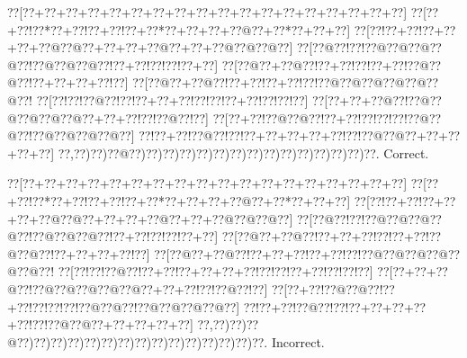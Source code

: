 \documentclass[a5paper]{article}
\begin{document}
\begin{center}
{\goo
\0??[\0??+\0??+\0??+\0??+\0??+\0??+\0??+\0??+\0??+\0??+\0??+\0??+\0??+\0??+\0??+\0??+\0??+\0??]
\0??[\0??+\0??!\0??*\0??+\0??!\0??+\0??!\0??+\0??*\0??+\0??+\0??+\0??@\0??+\0??*\0??+\0??+\0??]
\0??[\0??!\0??+\0??!\0??+\0??+\0??+\0??@\0??@\0??+\0??+\0??+\0??@\0??+\0??+\0??@\0??@\0??@\0??]
\0??[\0??@\0??!\0??!\0??@\0??@\0??@\0??@\0??!\0??@\0??@\0??@\0??!\0??+\0??!\0??!\0??!\0??+\0??]
\0??[\0??@\0??+\0??@\0??!\0??+\0??!\0??!\0??+\0??!\0??@\0??@\0??!\0??+\0??+\0??+\0??!\0??]
\0??[\0??@\0??+\0??@\0??!\0??+\0??!\0??+\0??!\0??!\0??@\0??@\0??@\0??@\0??@\0??@\0??!
\0??[\0??!\0??!\0??@\0??!\0??!\0??+\0??+\0??!\0??!\0??!\0??+\0??!\0??!\0??!\0??]
\0??[\0??+\0??+\0??@\0??!\0??@\0??@\0??@\0??@\0??@\0??+\0??+\0??!\0??!\0??@\0??!\0??]
\0??[\0??+\0??!\0??@\0??@\0??!\0??+\0??!\0??!\0??!\0??!\0??@\0??@\0??!\0??@\0??@\0??@\0??@\0??]
\0??!\0??+\0??!\0??@\0??!\0??!\0??+\0??+\0??+\0??+\0??!\0??!\0??@\0??@\0??+\0??+\0??+\0??+\0??]
\0??,\0??)\0??)\0??@\0??)\0??)\0??)\0??)\0??)\0??)\0??)\0??)\0??)\0??)\0??)\0??)\0??)\0??)\0??.
}
Correct. 

\end{center}
\begin{center}
{\goo
\0??[\0??+\0??+\0??+\0??+\0??+\0??+\0??+\0??+\0??+\0??+\0??+\0??+\0??+\0??+\0??+\0??+\0??+\0??]
\0??[\0??+\0??!\0??*\0??+\0??!\0??+\0??!\0??+\0??*\0??+\0??+\0??+\0??@\0??+\0??*\0??+\0??+\0??]
\0??[\0??!\0??+\0??!\0??+\0??+\0??+\0??@\0??@\0??+\0??+\0??+\0??@\0??+\0??+\0??@\0??@\0??@\0??]
\0??[\0??@\0??!\0??!\0??@\0??@\0??@\0??@\0??!\0??@\0??@\0??@\0??!\0??+\0??!\0??!\0??!\0??+\0??]
\0??[\0??@\0??+\0??@\0??!\0??+\0??+\0??!\0??!\0??+\0??!\0??@\0??@\0??!\0??+\0??+\0??+\0??!\0??]
\0??[\0??@\0??+\0??@\0??!\0??+\0??+\0??!\0??+\0??!\0??!\0??@\0??@\0??@\0??@\0??@\0??@\0??!
\0??[\0??!\0??!\0??@\0??!\0??+\0??!\0??+\0??+\0??+\0??!\0??!\0??!\0??+\0??!\0??!\0??!\0??]
\0??[\0??+\0??+\0??@\0??!\0??@\0??@\0??@\0??@\0??@\0??+\0??+\0??!\0??!\0??@\0??!\0??]
\0??[\0??+\0??!\0??@\0??@\0??!\0??+\0??!\0??!\0??!\0??!\0??@\0??@\0??!\0??@\0??@\0??@\0??@\0??]
\0??!\0??+\0??!\0??@\0??!\0??!\0??+\0??+\0??+\0??+\0??!\0??!\0??@\0??@\0??+\0??+\0??+\0??+\0??]
\0??,\0??)\0??)\0??@\0??)\0??)\0??)\0??)\0??)\0??)\0??)\0??)\0??)\0??)\0??)\0??)\0??)\0??)\0??.
}
Incorrect. 

\end{center}
\newpage
\end{document}
